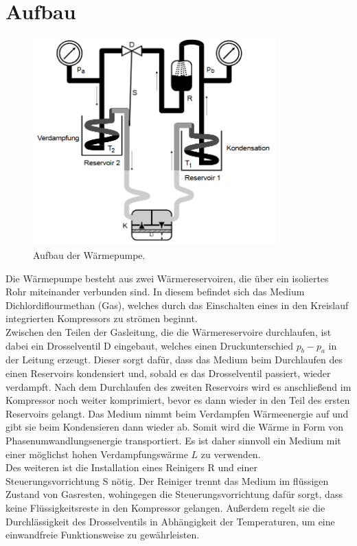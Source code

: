 \section{Aufbau}

\begin{figure}[H]
  \centering
  \includegraphics[height=8cm]{Waermepumpe.PNG}
  \caption{Aufbau der Wärmepumpe.\cite{sample}}
  \label{fig:plot}
\end{figure}

Die Wärmepumpe besteht aus zwei Wärmereservoiren, die über ein isoliertes
Rohr miteinander verbunden sind. In diesem befindet sich das Medium Dichlordiflourmethan (Gas), welches
durch das Einschalten eines in den Kreislauf integrierten Kompressors zu strömen
beginnt.\\
Zwischen den Teilen der Gasleitung, die die Wärmereservoire durchlaufen,
ist dabei ein Drosselventil D eingebaut, welches einen Druckunterschied $p_b-p_a$
in der Leitung erzeugt. Dieser sorgt dafür, dass das Medium beim Durchlaufen
des einen Reservoirs kondensiert und, sobald es das Drosselventil passiert,
wieder verdampft. Nach dem Durchlaufen des zweiten Reservoirs wird es anschließend im Kompressor noch
weiter komprimiert, bevor es dann wieder in den Teil des ersten Reservoirs gelangt.
Das Medium nimmt beim Verdampfen Wärmeenergie auf und gibt sie beim Kondensieren
dann wieder ab. Somit wird die Wärme in Form von Phasenumwandlungsenergie transportiert.
Es ist daher sinnvoll ein Medium mit einer möglichst hohen Verdampfungswärme $L$
zu verwenden.\\
Des weiteren ist die Installation eines Reinigers R und einer Steuerungsvorrichtung
S nötig. Der Reiniger trennt das Medium im flüssigen Zustand von Gasresten, wohingegen
die Steuerungsvorrichtung dafür sorgt, dass keine Flüssigkeitsreste in den Kompressor
gelangen. Außerdem regelt sie die Durchlässigkeit des Drosselventils in Abhängigkeit
der Temperaturen, um eine einwandfreie Funktionsweise zu gewährleisten.

\label{sec:Aufbau}
